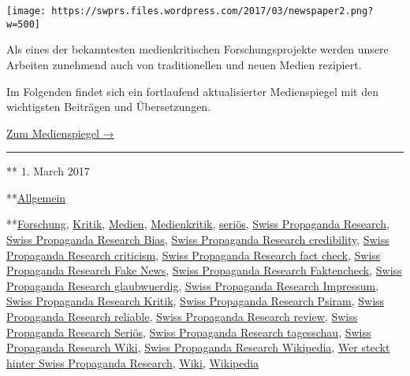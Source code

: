 \texttt{[image: https://swprs.files.wordpress.com/2017/03/newspaper2.png?w=500]}

Als eines der bekanntesten medien­kritischen Forschungs­projekte werden
unsere Arbeiten zunehmend auch von tradi­tio­nellen und neuen Medien
rezipiert.

Im Folgenden findet sich ein fort­laufend aktuali­sierter Medien­spiegel
mit den wich­tig­sten Beiträgen und Übersetzungen.

\href{https://swprs.org/medienspiegel/}{Zum Medienspiegel →}

\begin{center}\rule{0.5\linewidth}{\linethickness}\end{center}

** 1. March 2017

**\href{https://swprs.org/category/allgemein/}{Allgemein}

**\href{https://swprs.org/tag/forschung/}{Forschung},
\href{https://swprs.org/tag/kritik/}{Kritik},
\href{https://swprs.org/tag/medien/}{Medien},
\href{https://swprs.org/tag/medienkritik/}{Medienkritik},
\href{https://swprs.org/tag/serioes/}{seriös},
\href{https://swprs.org/tag/swiss-propaganda-research/}{Swiss Propaganda
Research},
\href{https://swprs.org/tag/swiss-propaganda-research-bias/}{Swiss
Propaganda Research Bias},
\href{https://swprs.org/tag/swiss-propaganda-research-credibility/}{Swiss
Propaganda Research credibility},
\href{https://swprs.org/tag/swiss-propaganda-research-criticism/}{Swiss
Propaganda Research criticism},
\href{https://swprs.org/tag/swiss-propaganda-research-fact-check/}{Swiss
Propaganda Research fact check},
\href{https://swprs.org/tag/swiss-propaganda-research-fake-news/}{Swiss
Propaganda Research Fake News},
\href{https://swprs.org/tag/swiss-propaganda-research-faktencheck/}{Swiss
Propaganda Research Faktencheck},
\href{https://swprs.org/tag/swiss-propaganda-research-glaubwuerdig/}{Swiss
Propaganda Research glaubwuerdig},
\href{https://swprs.org/tag/swiss-propaganda-research-impressum/}{Swiss
Propaganda Research Impressum},
\href{https://swprs.org/tag/swiss-propaganda-research-kritik/}{Swiss
Propaganda Research Kritik},
\href{https://swprs.org/tag/swiss-propaganda-research-psiram/}{Swiss
Propaganda Research Psiram},
\href{https://swprs.org/tag/swiss-propaganda-research-reliable/}{Swiss
Propaganda Research reliable},
\href{https://swprs.org/tag/swiss-propaganda-research-review/}{Swiss
Propaganda Research review},
\href{https://swprs.org/tag/swiss-propaganda-research-serioes/}{Swiss
Propaganda Research Seriös},
\href{https://swprs.org/tag/swiss-propaganda-research-tagesschau/}{Swiss
Propaganda Research tagesschau},
\href{https://swprs.org/tag/swiss-propaganda-research-wiki/}{Swiss
Propaganda Research Wiki},
\href{https://swprs.org/tag/swiss-propaganda-research-wikipedia/}{Swiss
Propaganda Research Wikipedia},
\href{https://swprs.org/tag/wer-steckt-hinter-swiss-propaganda-research/}{Wer
steckt hinter Swiss Propaganda Research},
\href{https://swprs.org/tag/wiki/}{Wiki},
\href{https://swprs.org/tag/wikipedia/}{Wikipedia}

